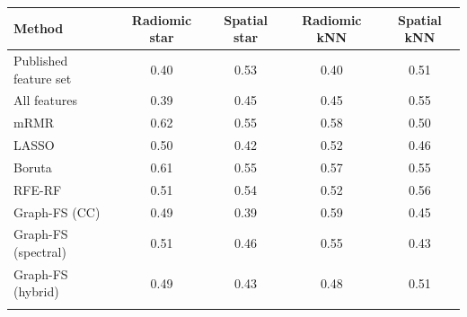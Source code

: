 \begin{tabular}{@{}lcccc@{}}
\toprule
Method & Radiomic star & Spatial star & Radiomic kNN & Spatial kNN \\
\midrule
Published feature set & 0.40 & 0.53 & 0.40 & 0.51 \\
All features & 0.39 & 0.45 & 0.45 & 0.55 \\
mRMR & 0.62 & 0.55 & 0.58 & 0.50 \\
LASSO & 0.50 & 0.42 & 0.52 & 0.46 \\
Boruta & 0.61 & 0.55 & 0.57 & 0.55 \\
RFE-RF & 0.51 & 0.54 & 0.52 & 0.56 \\
Graph-FS (CC) & 0.49 & 0.39 & 0.59 & 0.45 \\
Graph-FS (spectral) & 0.51 & 0.46 & 0.55 & 0.43 \\
Graph-FS (hybrid) & 0.49 & 0.43 & 0.48 & 0.51 \\
\botrule
\end{tabular}
